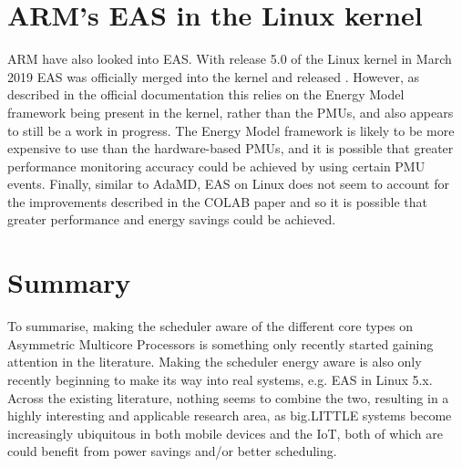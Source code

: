 \section{ARM's EAS in the Linux kernel}
ARM have also looked into EAS. With release 5.0 of the Linux kernel in March
2019 \cite{torvalds_linux_2019} EAS was officially merged into the kernel and
released \cite{noauthor_linux_2019}. However, as described in the official
documentation \cite{noauthor_energy_nodate} this relies on the Energy Model
framework being present in the kernel, rather than the PMUs, and also appears 
to still be a work in progress. The Energy Model framework is likely to be more 
expensive to use than the hardware-based PMUs, and it is possible that greater 
performance monitoring accuracy could be achieved by using certain PMU events. 
Finally, similar to AdaMD, EAS on Linux does not seem to account for the 
improvements described in the COLAB paper and so it is possible that greater 
performance and energy savings could be achieved.

\section{Summary}
To summarise, making the scheduler aware of the different core types on
Asymmetric Multicore Processors is something only recently started gaining
attention in the literature. Making the scheduler energy aware is also only
recently beginning to make its way into real systems, e.g. EAS in Linux 5.x.
Across the existing literature, nothing seems to combine the two, resulting in a
highly interesting and applicable research area, as big.LITTLE systems become
increasingly ubiquitous in both mobile devices and the IoT, both of which are
could benefit from power savings and/or better scheduling.
